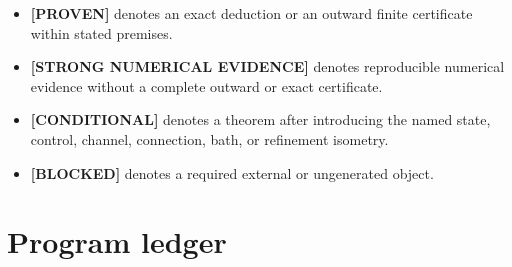 \documentclass[11pt,a4paper]{article}
\newcommand{\Proven}{\textcolor{proved}{\textbf{[PROVEN]}}}
\newcommand{\Evidence}{\textcolor{conditional}{\textbf{[STRONG NUMERICAL EVIDENCE]}}}
\newcommand{\Conditional}{\textcolor{conditional}{\textbf{[CONDITIONAL]}}}
\newcommand{\Blocked}{\textcolor{blocked}{\textbf{[BLOCKED]}}}
\begin{document}
\begin{itemize}
\item \Proven{} denotes an exact deduction or an outward finite certificate within stated
premises.
\item \Evidence{} denotes reproducible numerical evidence without a complete outward or
exact certificate.
\item \Conditional{} denotes a theorem after introducing the named state, control,
channel, connection, bath, or refinement isometry.
\item \Blocked{} denotes a required external or ungenerated object.
\end{itemize}

\section{Program ledger}
\end{document}
